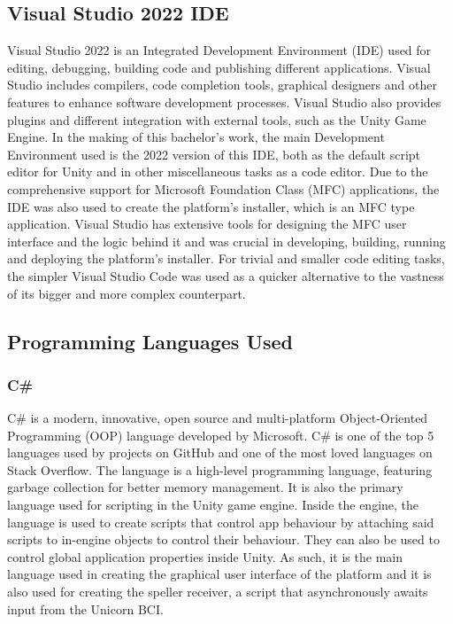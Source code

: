 \subsection{Visual Studio 2022 IDE}
Visual Studio 2022 is an Integrated Development Environment (IDE) used for editing, debugging, building code and publishing different applications. Visual Studio includes compilers, code completion tools, graphical designers and other features to enhance software development processes\cite{VisualStudio}. Visual Studio also provides plugins and different integration with external tools, such as the Unity Game Engine. In the making of this bachelor's work, the main Development Environment used is the 2022 version of this IDE, both as the default script editor for Unity and in other miscellaneous tasks as a code editor.
\vspace{\baselineskip}\newline
Due to the comprehensive support for Microsoft Foundation Class (MFC) applications, the IDE was also used to create the platform's installer, which is an MFC type application. Visual Studio has extensive tools for designing the MFC user interface and the logic behind it and was crucial in developing, building, running and deploying the platform's installer.
\vspace{\baselineskip}\newline
For trivial and smaller code editing tasks, the simpler Visual Studio Code was used as a quicker alternative to the vastness of its bigger and more complex counterpart.
\vspace{\baselineskip}\newline


\subsection{Programming Languages Used}
\subsubsection{C\#}
C\# is a modern, innovative, open source and multi-platform Object-Oriented Programming (OOP) language\cite{C_sharp} developed by Microsoft. C\# is one of the top 5 languages used by projects on GitHub and one of the most loved languages on Stack Overflow\cite{StackOverflow_language_survey}. The language is a high-level programming language, featuring garbage collection for better memory management. It is also the primary language used for scripting in the Unity game engine. Inside the engine, the language is used to create scripts that control app behaviour by attaching said scripts to in-engine objects to control their behaviour. They can also be used to control global application properties inside Unity. As such, it is the main language used in creating the graphical user interface of the platform and it is also used for creating the speller receiver, a script that asynchronously awaits input from the Unicorn BCI.

